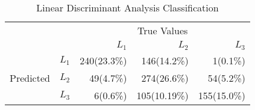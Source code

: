 \begin{table}
\centering
  \caption{Linear Discriminant Analysis Classification}
  \begin{tabular}{rrrrr}
    \toprule
    & &\multicolumn{3}{c}{True Values}\\
    & & ${L_1}$ & ${L_2}$ & ${L_3}$ \\
    \multirow{3}{*}{Predicted} & ${L_1}$ & 240(23.3\%) & 146(14.2\%) & 1(0.1\%) \\
    & ${L_2}$ & 49(4.7\%) & 274(26.6\%) & 54(5.2\%) \\
    & ${L_3}$ & 6(0.6\%) & 105(10.19\%) & 155(15.0\%) \\\bottomrule
  \end{tabular}
\end{table}
